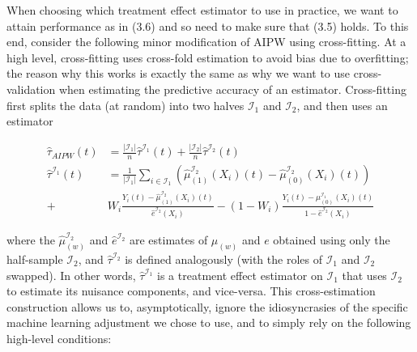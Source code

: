 When choosing which treatment effect estimator to use in practice, we want to attain
performance as in (3.6) and so need to make sure that (3.5) holds. To this end, consider
the following minor modification of AIPW using cross-fitting. At a high level,
cross-fitting uses cross-fold estimation to avoid bias due to overfitting; the reason
why this works is exactly the same as why we want to use cross-validation when
estimating the predictive accuracy of an estimator. Cross-fitting first splits the data
(at random) into two halves $\mathcal{I}_1$ and $\mathcal{I}_2$, and then uses an
estimator

\begin{align}
\hat{\tau}_{AIPW}(t) &= \frac{|\mathcal{I}_1|}{n} \hat{\tau}^{\mathcal{I}_1}(t) +
    \frac{|\mathcal{I}_2|}{n} \hat{\tau}^{\mathcal{I}_2}(t)\\
    \hat{\tau}^{\mathcal{I}_1}(t) &= \frac{1}{|\mathcal{I}_1|} \sum_{i\in\mathcal{I}_1}
    (\hat{\mu}_{(1)}^{\mathcal{I}_2}(X_i)(t) - \hat{\mu}_{(0)}^{\mathcal{I}_2}(X_i)(t))\\
    + &W_i \frac{Y_i(t) -
    \hat{\mu}_{(1)}^{\mathcal{I}_2}(X_i)(t)}{\hat{e}^{\mathcal{I}_2}(X_i)} - (1 - W_i)
    \frac{Y_i(t) - \mu_{(0)}^{\mathcal{I}_1}(X_i)(t)}{1 - \hat{e}^{\mathcal{I}_2}(X_i)}
\end{align}

where the $\hat{\mu}^{\mathcal{I}_2}_{(w)}$ and $\hat{e}^{\mathcal{I}_2}$ are estimates
of $\mu_{(w)}$ and $e$ obtained using only the half-sample $\mathcal{I}_2$, and
$\hat{\tau}^{\mathcal{I}_2}$ is defined analogously (with the roles of $\mathcal{I}_1$
and $\mathcal{I}_2$ swapped). In other words, $\hat{\tau}^{\mathcal{I}_1}$ is a
treatment effect estimator on $\mathcal{I}_1$ that uses $\mathcal{I}_2$ to estimate its
nuisance components, and vice-versa. This cross-estimation construction allows us to,
asymptotically, ignore the idiosyncrasies of the specific machine learning adjustment we
chose to use, and to simply rely on the following high-level conditions:

